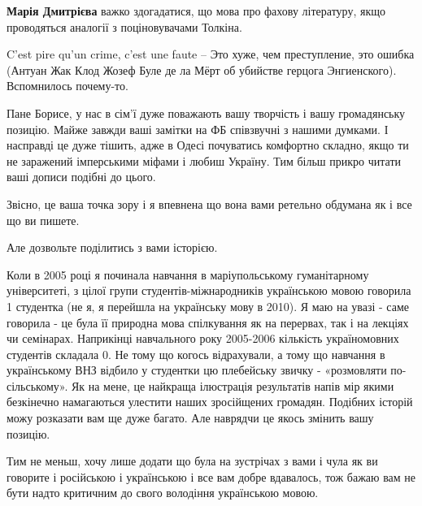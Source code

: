 \begin{itemize}
\begin{itemize}
\textbf{Марія Дмитрієва} важко здогадатися, що мова про фахову літературу, якщо проводяться аналогії з поціновувачами Толкіна.

\end{itemize}

 

C'est pire qu'un crime, c'est une faute – Это хуже, чем преступление, это
ошибка (Антуан Жак Клод Жозеф Буле де ла Мёрт об убийстве герцога Энгиенского).
Вспомнилось почему-то.



Пане Борисе, у нас в сім’ї дуже поважають вашу творчість і вашу громадянську
позицію. Майже завжди ваші замітки на ФБ співзвучні з нашими думками. І
насправді це дуже тішить, адже в Одесі почуватись комфортно складно, якщо ти не
заражений імперськими міфами і любиш Україну. Тим більш прикро читати ваші
дописи подібні до цього.

Звісно, це ваша точка зору і я впевнена що вона вами ретельно обдумана як і все
що ви пишете.

Але дозвольте поділитись з вами історією.

Коли в 2005 році я починала навчання в маріупольському гуманітарному
університеті, з цілої групи студентів-міжнародників українською мовою говорила
1 студентка (не я, я перейшла на українську мову в 2010). Я маю на увазі - саме
говорила - це була її природна мова спілкування як на перервах, так і на
лекціях чи семінарах. Наприкінці навчального року 2005-2006 кількість
україномовних студентів складала 0. Не тому що когось відрахували, а тому що
навчання в українському ВНЗ відбило у студентки цю плебейську звичку -
«розмовляти по-сільському». Як на мене, це найкраща ілюстрація результатів
напів мір якими безкінечно намагаються улестити наших зросійщених громадян.
Подібних історій можу розказати вам ще дуже багато. Але наврядчи це якось
змінить вашу позицію.

Тим не меньш, хочу лише додати що була на зустрічах з вами і чула як ви
говорите і російською і українською і все вам добре вдавалось, тож бажаю вам не
бути надто критичним до свого володіння українською мовою.

\end{itemize}

